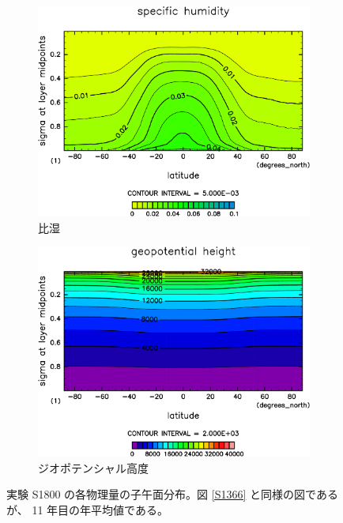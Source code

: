 \documentclass[body]{subfiles}
\begin{document}
\begin{figure}[t]
\begin{subfigure}{.4\textwidth}
		\includegraphics[width=\columnwidth]{S1800/QH2OVap,time=3650:4015-crop-rotate.pdf}
		\caption{比湿\hmu*{[kg/kg]}}\label{S1800比湿}
	\end{subfigure}
	\begin{subfigure}{.4\textwidth}
		\centering
		\includegraphics[width=\columnwidth]{S1800/Height,time=3650:4015-crop-rotate.pdf}
		\caption{ジオポテンシャル高度\hmu*{[m]}}\label{S1800ジオポテンシャル高度}
	\end{subfigure}
	\caption[実験 S1800 の各物理量の子午面分布]{
		実験 S1800 の各物理量の子午面分布。図 \ref{S1366} と同様の図であるが、
		11 年目の年平均値である。
	}\label{S1800}
\end{figure}
\end{document}

